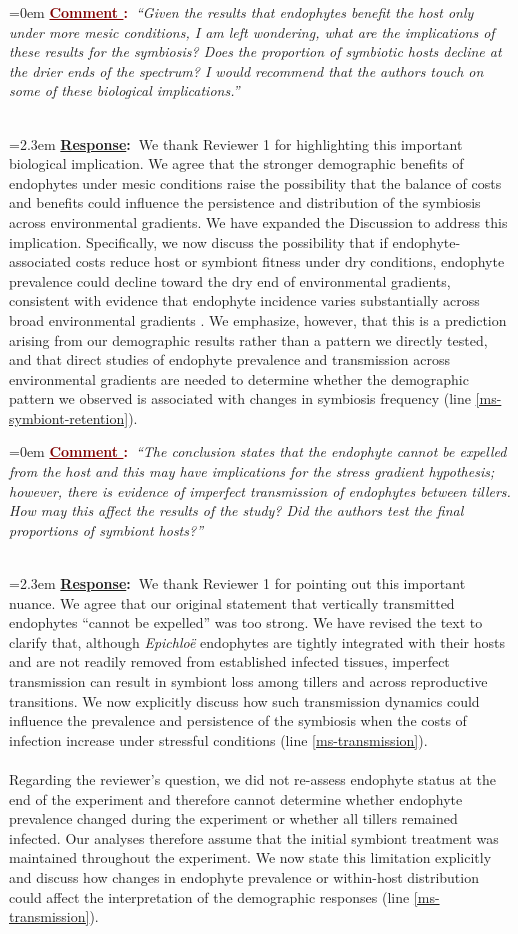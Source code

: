 \documentclass[12pt]{article}
\newcounter{cN}
\newcommand{\comment}[1]{
	\vspace{2em}
	\refstepcounter{cN} %
	\noindent \hangindent=0em \textbf{\textcolor{Maroon}{\uline{Comment \thecN}:~}}\emph{``#1''}
	}
\newcommand{\response}[1]{
	\\[0.25em]
	\hangindent=2.3em \textbf{\textcolor{NavyBlue}{\uline{Response}:~}}#1
	}
\providecommand{\uline}[1]{\underline{#1}}
\begin{document}
\comment{Given the results that endophytes benefit the host only under more mesic conditions, I am left wondering, what are the implications of these results for the symbiosis? Does the proportion of symbiotic hosts decline at the drier ends of the spectrum? I would recommend that the authors touch on some of these biological implications.}
\response{We thank Reviewer 1 for highlighting this important biological implication. We agree that the stronger demographic benefits of endophytes under mesic conditions raise the possibility that the balance of costs and benefits could influence the persistence and distribution of the symbiosis across environmental gradients. We have expanded the Discussion to address this implication. Specifically, we now discuss the possibility that if endophyte-associated costs reduce host or symbiont fitness under dry conditions, endophyte prevalence could decline toward the dry end of environmental gradients, consistent with evidence that endophyte incidence varies substantially across broad environmental gradients \citep{afkhami2009endophyte, semmartin2015broad}. We emphasize, however, that this is a prediction arising from our demographic results rather than a pattern we directly tested, and that direct studies of endophyte prevalence and transmission across environmental gradients are needed to determine whether the demographic pattern we observed is associated with changes in symbiosis frequency (line \ref{ms-symbiont-retention}).}

\comment{The conclusion states that the endophyte cannot be expelled from the host and this may have implications for the stress gradient hypothesis; however, there is evidence of imperfect transmission of endophytes between tillers. How may this affect the results of the study? Did the authors test the final proportions of symbiont hosts?}
\response{We thank Reviewer 1 for pointing out this important nuance. We agree that our original statement that vertically transmitted endophytes ``cannot be expelled'' was too strong. We have revised the text to clarify that, although \textit{Epichloë} endophytes are tightly integrated with their hosts and are not readily removed from established infected tissues, imperfect transmission can result in symbiont loss among tillers and across reproductive transitions. We now explicitly discuss how such transmission dynamics could influence the prevalence and persistence of the symbiosis when the costs of infection increase under stressful conditions (line \ref{ms-transmission}).\\
\\
Regarding the reviewer's question, we did not re-assess endophyte status at the end of the experiment and therefore cannot determine whether endophyte prevalence changed during the experiment or whether all tillers remained infected. Our analyses therefore assume that the initial symbiont treatment was maintained throughout the experiment. We now state this limitation explicitly and discuss how changes in endophyte prevalence or within-host distribution could affect the interpretation of the demographic responses (line \ref{ms-transmission}).}
\end{document}
